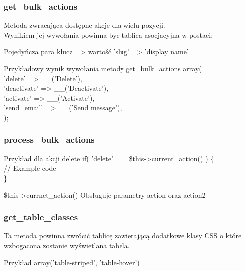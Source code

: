 \documentclass[a4paper, 16pt]{beamer}
\begin{document}
			\begin{frame}
				\frametitle{get\_bulk\_actions}
				Metoda zwracająca dostępne akcje dla wielu pozycji. \\
				Wynikiem jej wywołania powinna byc tablica asocjacyjna w postaci:
				\begin{block}{Pojedyńcza para klucz => wartość}
					'slug' => 'display name'
				\end{block}
				\begin{exampleblock}{Przykładowy wynik wywołania metody get\_bulk\_actions}
					array(\\
            		\hspace{0.5cm}'delete' => \_\_('Delete'),\\
            		\hspace{0.5cm}'deactivate' => \_\_('Deactivate'),\\
            		\hspace{0.5cm}'activate' => \_\_('Activate'),\\
            		\hspace{0.5cm}'send\_email' => \_\_('Send message'),\\
        			);
    			\end{exampleblock}
			\end{frame}
			\begin{frame}
				\frametitle{process\_bulk\_actions}
				\begin{exampleblock}{Przykład dla akcji delete}
					if( 'delete'===\$this->current\_action() ) \{\\
	                \hspace{0.5cm}// Example code\\
	                \}
                \end{exampleblock}
                \begin{block}{\$this->currnet\_action()}
                	Obsługuje parametry action oraz action2
                \end{block}
            \end{frame}
            \begin{frame}
            	\frametitle{get\_table\_classes}
            	Ta metoda powinna zwrócić tablicę zawierającą dodatkowe klasy CSS o które wzbogacona zostanie wyświetlana tabela.
            	\begin{exampleblock}{Przykład}
            		array('table-striped', 'table-hover')
        		\end{exampleblock}
            \end{frame}
\end{document}
